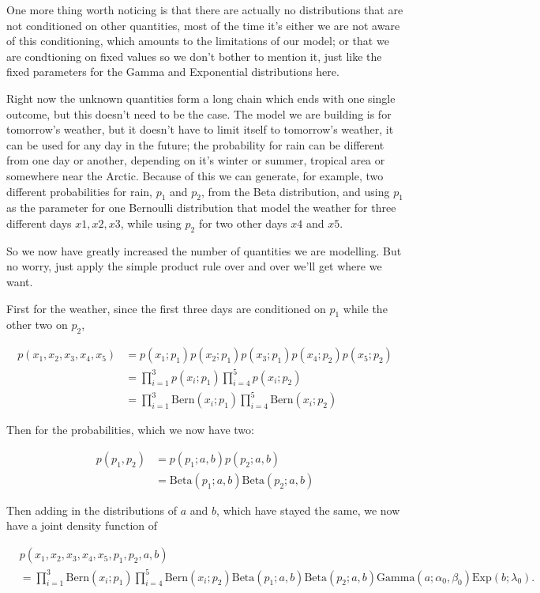 \documentclass[11pt]{article}
\begin{document}
One more thing worth noticing is that there are actually no distributions that are not conditioned on other quantities, most of the time it's either we are not aware of this conditioning, which amounts to the limitations of our model; or that we are condtioning on fixed values so we don't bother to mention it, just like the fixed parameters for the Gamma and Exponential distributions here.

Right now the unknown quantities form a long chain which ends with one single outcome, but this doesn't need to be the case. The model we are building is for tomorrow's weather, but it doesn't have to limit itself to tomorrow's weather, it can be used for any day in the future; the probability for rain can be different from one day or another, depending on it's winter or summer, tropical area or somewhere near the Arctic. Because of this we can generate, for example, two different probabilities for rain, \(p_1\) and \(p_2\), from the Beta distribution, and using \(p_1\) as the parameter for one Bernoulli distribution that model the weather for three different days \(x1, x2, x3\), while using \(p_2\) for two other days \(x4\) and \(x5\).

So we now have greatly increased the number of quantities we are modelling. But no worry, just apply the simple product rule over and over we'll get where we want.

First for the weather, since the first three days are conditioned on \(p_1\) while the other two on \(p_2\),

\begin{align*}
p(x_1, x_2, x_3, x_4, x_5) &= p(x_1; p_1) p(x_2; p_1) p(x_3; p_1)p(x_4; p_2)p(x_5; p_2) \\
&= \prod_{i=1}^3 p(x_i; p_1) \prod_{i=4}^5 p(x_i; p_2) \\
&= \prod_{i=1}^3 \text{Bern}(x_i; p_1) \prod_{i=4}^5 \text{Bern}(x_i; p_2)
\end{align*}

Then for the probabilities, which we now have two:

\begin{align*}
p(p_1, p_2) &= p(p_1; a, b) p(p_2; a, b) \\
&= \text{Beta} (p_1; a, b)\text{Beta} (p_2; a, b)
\end{align*}

Then adding in the distributions of \(a\) and \(b\), which have stayed the same, we now have a joint density function of

\begin{align*}
& p(x_1, x_2, x_3, x_4, x_5, p_1, p_2, a ,b) \\
&= \prod_{i=1}^3 \text{Bern}(x_i; p_1) \prod_{i=4}^5 \text{Bern}(x_i; p_2) \text{Beta} (p_1; a, b)\text{Beta} (p_2; a, b) \text{Gamma} (a; \alpha_0, \beta_0) \text{Exp} (b; \lambda_0).
\end{align*}
\end{document}
